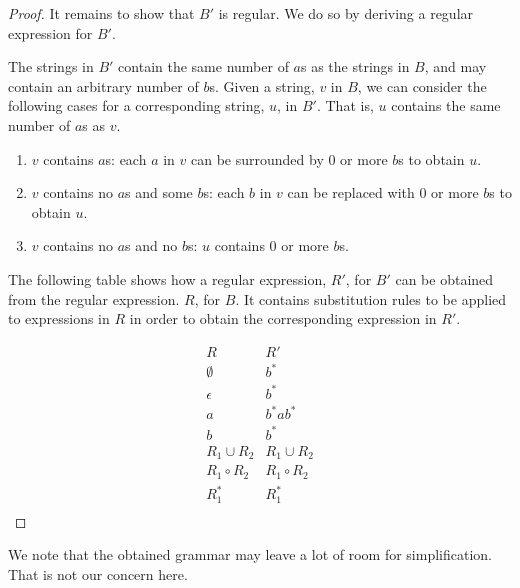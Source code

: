 \documentclass[addpoints]{exam}
\theoremstyle{claim}
\begin{document}
\begin{questions}
\begin{solution}
\begin{proof}
    It remains to show that $B'$ is regular. We do so by deriving a regular expression for $B'$.

    The strings in $B'$ contain the same number of $a$s as the strings in $B$, and may contain an arbitrary number of $b$s. Given a string, $v$ in $B$, we can consider the following cases for a corresponding string, $u$, in $B'$. That is, $u$ contains the same number of $a$s as $v$.
    \begin{enumerate}
    \item $v$ contains $a$s: each $a$ in $v$ can be surrounded by 0 or more $b$s to obtain $u$.
    \item $v$ contains no $a$s and some $b$s: each $b$ in $v$ can be replaced with 0 or more $b$s to obtain $u$.
    \item $v$ contains no $a$s and no $b$s: $u$ contains 0 or more $b$s.
    \end{enumerate}

    The following table shows how a regular expression, $R'$, for $B'$ can be obtained from the regular expression. $R$, for $B$. It contains substitution rules to be applied to expressions in $R$ in order to obtain the corresponding expression in $R'$.

    \[
    \begin{array}{cc}
      R & R' \\
      \hline
      \emptyset & b^* \\
      \epsilon & b^* \\
      a & b^*ab^* \\
      b & b^* \\
      R_1\cup R_2 & R_1\cup R_2 \\
      R_1\circ R_2 & R_1\circ R_2 \\
      R_1^* & R_1^* \\
    \end{array}
    \]
    \end{proof}
    We note that the obtained grammar may leave a lot of room for simplification. That is not our concern here.
  \end{solution}
\end{questions}
\end{document}
